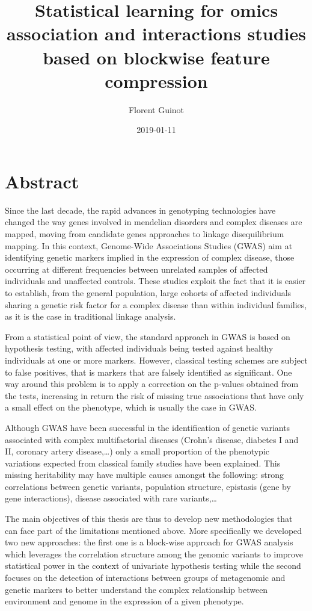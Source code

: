 \documentclass[]{book}
\title{Statistical learning for omics association and interactions studies based on blockwise feature compression}
\author{Florent Guinot}
\date{2019-01-11}
\begin{document}
\maketitle

{
\setcounter{tocdepth}{1}
\tableofcontents
}
\hypertarget{abstract}{%
\chapter*{Abstract}\label{abstract}}

Since the last decade, the rapid advances in genotyping technologies have changed the way genes involved in mendelian disorders and complex diseases are mapped, moving from candidate genes approaches to linkage disequilibrium mapping. In this context, Genome-Wide Associations Studies (GWAS) aim at identifying genetic markers implied in the expression of complex disease, those occurring at different frequencies between unrelated samples of affected individuals and unaffected controls. These studies exploit the fact that it is easier to establish, from the general population, large cohorts of affected individuals sharing a genetic risk factor for a complex disease than within individual families, as it is the case in traditional linkage analysis.

From a statistical point of view, the standard approach in GWAS is based on hypothesis testing, with affected individuals being tested against healthy individuals at one or more markers. However, classical testing schemes are subject to false positives, that is markers that are falsely identified as significant. One way around this problem is to apply a correction on the p-values obtained from the tests, increasing in return the risk of missing true associations that have only a small effect on the phenotype, which is usually the case in GWAS.

Although GWAS have been successful in the identification of genetic variants associated with complex multifactorial diseases (Crohn's disease, diabetes I and II, coronary artery disease,\ldots{}) only a small proportion of the phenotypic variations expected from classical family studies have been explained. This missing heritability may have multiple causes amongst the following: strong correlations between genetic variants, population structure, epistasis (gene by gene interactions), disease associated with rare variants,\dots

The main objectives of this thesis are thus to develop new methodologies that can face part of the limitations mentioned above. More specifically we developed two new approaches: the first one is a block-wise approach for GWAS analysis which leverages the correlation structure among the genomic variants to improve statistical power in the context of univariate hypothesis testing while the second focuses on the detection of interactions between groups of metagenomic and genetic markers to better understand the complex relationship between environment and genome in the expression of a given phenotype.
\end{document}
